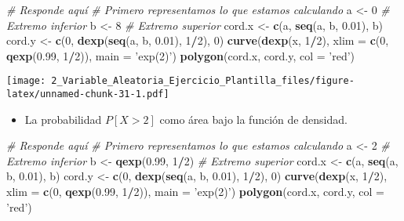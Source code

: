 \documentclass[
]{article}
\newenvironment{Shaded}{\begin{snugshade}}{\end{snugshade}}
\newcommand{\CommentTok}[1]{\textcolor[rgb]{0.56,0.35,0.01}{\textit{#1}}}
\newcommand{\DataTypeTok}[1]{\textcolor[rgb]{0.13,0.29,0.53}{#1}}
\newcommand{\DecValTok}[1]{\textcolor[rgb]{0.00,0.00,0.81}{#1}}
\newcommand{\FloatTok}[1]{\textcolor[rgb]{0.00,0.00,0.81}{#1}}
\newcommand{\KeywordTok}[1]{\textcolor[rgb]{0.13,0.29,0.53}{\textbf{#1}}}
\newcommand{\NormalTok}[1]{#1}
\newcommand{\OperatorTok}[1]{\textcolor[rgb]{0.81,0.36,0.00}{\textbf{#1}}}
\newcommand{\StringTok}[1]{\textcolor[rgb]{0.31,0.60,0.02}{#1}}
\providecommand{\tightlist}{%
  \setlength{\itemsep}{0pt}\setlength{\parskip}{0pt}}
\begin{document}
\begin{Shaded}
\begin{Highlighting}[]
\CommentTok{# Responde aquí}
\CommentTok{# Primero representamos lo que estamos calculando}
\NormalTok{a <-}\StringTok{ }\DecValTok{0} \CommentTok{# Extremo inferior}
\NormalTok{b <-}\StringTok{ }\DecValTok{8} \CommentTok{# Extremo superior}
\NormalTok{cord.x <-}\StringTok{ }\KeywordTok{c}\NormalTok{(a, }\KeywordTok{seq}\NormalTok{(a, b, }\FloatTok{0.01}\NormalTok{), b) }
\NormalTok{cord.y <-}\StringTok{ }\KeywordTok{c}\NormalTok{(}\DecValTok{0}\NormalTok{, }\KeywordTok{dexp}\NormalTok{(}\KeywordTok{seq}\NormalTok{(a, b, }\FloatTok{0.01}\NormalTok{), }\DecValTok{1}\OperatorTok{/}\DecValTok{2}\NormalTok{), }\DecValTok{0}\NormalTok{) }
\KeywordTok{curve}\NormalTok{(}\KeywordTok{dexp}\NormalTok{(x, }\DecValTok{1}\OperatorTok{/}\DecValTok{2}\NormalTok{), }\DataTypeTok{xlim =} \KeywordTok{c}\NormalTok{(}\DecValTok{0}\NormalTok{, }\KeywordTok{qexp}\NormalTok{(}\FloatTok{0.99}\NormalTok{, }\DecValTok{1}\OperatorTok{/}\DecValTok{2}\NormalTok{)), }\DataTypeTok{main =} \StringTok{'exp(2)'}\NormalTok{)}
\KeywordTok{polygon}\NormalTok{(cord.x, cord.y, }\DataTypeTok{col =} \StringTok{'red'}\NormalTok{)}
\end{Highlighting}
\end{Shaded}

\texttt{[image: 2\_Variable\_Aleatoria\_Ejercicio\_Plantilla\_files/figure-latex/unnamed-chunk-31-1.pdf]}

\begin{itemize}
\tightlist
\item
  La probabilidad \(P [X > 2]\) como área bajo la función de densidad.
\end{itemize}

\begin{Shaded}
\begin{Highlighting}[]
\CommentTok{# Responde aquí}
\CommentTok{# Primero representamos lo que estamos calculando}
\NormalTok{a <-}\StringTok{ }\DecValTok{2} \CommentTok{# Extremo inferior}
\NormalTok{b <-}\StringTok{ }\KeywordTok{qexp}\NormalTok{(}\FloatTok{0.99}\NormalTok{, }\DecValTok{1}\OperatorTok{/}\DecValTok{2}\NormalTok{) }\CommentTok{# Extremo superior}
\NormalTok{cord.x <-}\StringTok{ }\KeywordTok{c}\NormalTok{(a, }\KeywordTok{seq}\NormalTok{(a, b, }\FloatTok{0.01}\NormalTok{), b) }
\NormalTok{cord.y <-}\StringTok{ }\KeywordTok{c}\NormalTok{(}\DecValTok{0}\NormalTok{, }\KeywordTok{dexp}\NormalTok{(}\KeywordTok{seq}\NormalTok{(a, b, }\FloatTok{0.01}\NormalTok{), }\DecValTok{1}\OperatorTok{/}\DecValTok{2}\NormalTok{), }\DecValTok{0}\NormalTok{) }
\KeywordTok{curve}\NormalTok{(}\KeywordTok{dexp}\NormalTok{(x, }\DecValTok{1}\OperatorTok{/}\DecValTok{2}\NormalTok{), }\DataTypeTok{xlim =} \KeywordTok{c}\NormalTok{(}\DecValTok{0}\NormalTok{, }\KeywordTok{qexp}\NormalTok{(}\FloatTok{0.99}\NormalTok{, }\DecValTok{1}\OperatorTok{/}\DecValTok{2}\NormalTok{)), }\DataTypeTok{main =} \StringTok{'exp(2)'}\NormalTok{)}
\KeywordTok{polygon}\NormalTok{(cord.x, cord.y, }\DataTypeTok{col =} \StringTok{'red'}\NormalTok{)}
\end{Highlighting}
\end{Shaded}
\end{document}
